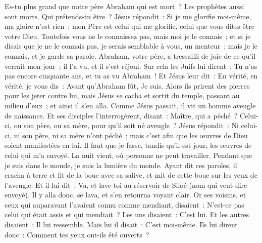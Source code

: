 \begin{multicols}{2}
Es-tu plus grand que notre père Abraham qui est mort~? Les prophètes aussi sont morts. Qui prétends-tu être~?
Jésus répondit~: Si je me glorifie moi-même, ma gloire n'est rien~; mon Père est celui qui me glorifie, celui que vous dites être votre Dieu.
Toutefois vous ne le connaissez pas, mais moi je le connais~; et si je disais que je ne le connais pas, je serais semblable à vous, un menteur~; mais je le connais, et je garde sa parole.
Abraham, votre père, a tressailli de joie de ce qu'il verrait mon jour~; il l'a vu, et il s'est réjoui.
Sur cela les Juifs lui dirent~: Tu n'as pas encore cinquante ans, et tu as vu Abraham~!
Et Jésus leur dit~: En vérité, en vérité, je vous dis~: Avant qu'Abraham fût, Je suis.
Alors ils prirent des pierres pour les jeter contre lui, mais Jésus se cacha et sortit du temple, passant au milieu d'eux~; et ainsi il s'en alla.
\VerseOne{}Comme Jésus passait, il vit un homme aveugle de naissance.
Et ses disciples l'interrogèrent, disant~: Maître, qui a péché~? Celui-ci, ou son père, ou sa mère, pour qu'il soit né aveugle~?
Jésus répondit~: Ni celui-ci, ni son père, ni sa mère n'ont péché~; mais c'est afin que les œuvres de Dieu soient manifestées en lui.
Il faut que je fasse, tandis qu'il est jour, les œuvres de celui qui m'a envoyé. La nuit vient, où personne ne peut travailler.
Pendant que je suis dans le monde, je suis la lumière du monde.
Ayant dit ces paroles, il cracha à terre et fit de la boue avec sa salive, et mit de cette boue sur les yeux de l'aveugle.
Et il lui dit~: Va, et lave-toi au réservoir de Siloé (nom qui veut dire envoyé). Il y alla donc, se lava, et s'en retourna voyant clair.
Or ses voisins, et ceux qui auparavant l'avaient connu comme mendiant, disaient~: N'est-ce pas celui qui était assis et qui mendiait~?
Les uns disaient~: C'est lui. Et les autres disaient~: Il lui ressemble. Mais lui il disait~: C'est moi-même.
Ils lui dirent donc~: Comment tes yeux ont-ils été ouverts~?

\end{multicols}

